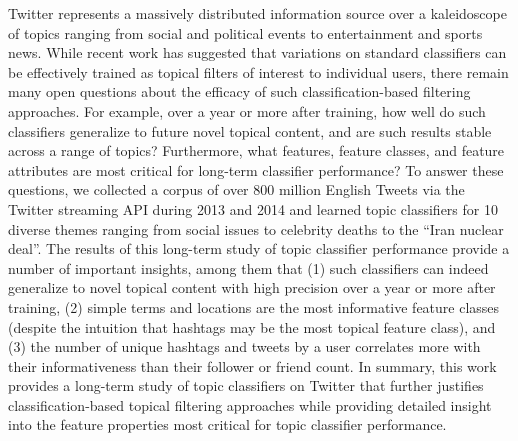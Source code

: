 
Twitter represents a massively distributed information source over a kaleidoscope of topics ranging from social and political events to entertainment and sports news.  While recent work has suggested that variations on standard classifiers can be effectively trained as topical filters of interest to individual users, there remain many open questions about the efficacy of such classification-based filtering approaches.  For example, over a year or more after training, how well do such classifiers generalize to future novel topical content, and are such results stable across a range of topics?  Furthermore, what features, feature classes, and feature attributes are most critical for long-term classifier performance?  To answer these questions, we collected a corpus of over 800 million English Tweets via the Twitter streaming API during 2013 and 2014 and learned topic classifiers for 10 diverse themes ranging from social issues to celebrity deaths to the ``Iran nuclear deal''.  The results of this long-term study of topic classifier performance provide a number of important insights, among them that (1) such classifiers can indeed generalize to novel topical content with high precision over a year or more after training, (2) simple terms and locations are the most informative feature classes (despite the intuition that hashtags may be the most topical feature class), and (3) the number of unique hashtags and tweets by a user correlates more with their informativeness than their follower or friend count.  In summary, this work provides a long-term study of topic classifiers on Twitter that further justifies classification-based topical filtering approaches while providing detailed insight into the feature properties most critical for topic classifier performance.